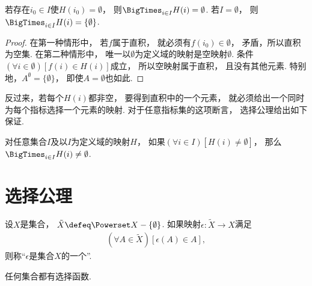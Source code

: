 \begin{property}
    若存在\(i_0\in I\)使\(H(i_0)=\emptyset\)，
    则\(\BigTimes_{i\in I}H(i)=\emptyset\).
    若\(I=\emptyset\)，
    则\(\BigTimes_{i\in I}H(i)=\{\emptyset\}\).
    \begin{proof}
        在第一种情形中，
        若\(f\)属于直积，
        就必须有\(f(i_0)\in\emptyset\)，
        矛盾，所以直积为空集.
        在第二种情形中，
        唯一以\(\emptyset\)为定义域的映射是空映射\(\emptyset\).
        条件\((\forall i\in\emptyset)[f(i)\in H(i)]\)成立，
        所以空映射属于直积，
        且没有其他元素.
        特别地，\(A^{\emptyset}=\{\emptyset\}\)，
        即使\(A=\emptyset\)也如此.
    \end{proof}
\end{property}

反过来，若每个\(H(i)\)都非空，
要得到直积中的一个元素，
就必须给出一个同时为每个指标选择一个元素的映射.
对于任意指标集的这项断言，
选择公理给出如下保证.
\begin{axiom}[选择公理(第二种形式)]
    对任意集合\(I\)及以\(I\)为定义域的映射\(H\)，
    如果\((\forall i\in I)[H(i)\neq\emptyset]\)，
    那么\(\BigTimes_{i\in I}H(i)\neq\emptyset\).
\end{axiom}

\section{选择公理}
\begin{definition}
    设\(X\)是集合，
    \(\tilde{X}\defeq\Powerset X-\{\emptyset\}\).
    如果映射\(\epsilon\colon\tilde{X}\to X\)满足
    \begin{align*}
        (\forall A\in\tilde{X})[\epsilon(A)\in A],
    \end{align*}
    则称“\(\epsilon\)是集合\(X\)的一个”.
\end{definition}

\begin{axiom}
    任何集合都有选择函数.
\end{axiom}

